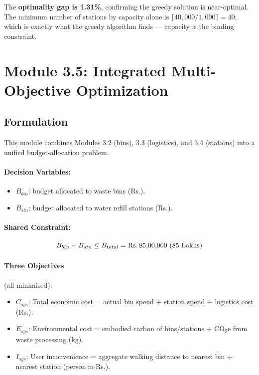 \documentclass[11pt,a4paper]{article}
\begin{document}
The \textbf{optimality gap is 1.31\%}, confirming the greedy solution is near-optimal. The minimum number of stations by capacity alone is $\lceil 40{,}000 / 1{,}000 \rceil = 40$, which is exactly what the greedy algorithm finds --- capacity is the binding constraint.

\section{Module 3.5: Integrated Multi-Objective Optimization}
\label{sec:mod35}

\subsection{Formulation}

This module combines Modules 3.2 (bins), 3.3 (logistics), and 3.4 (stations) into a unified budget-allocation problem.

\paragraph{Decision Variables:}
\begin{itemize}
    \item $B_{bin}$: budget allocated to waste bins (Rs.).
    \item $B_{stn}$: budget allocated to water refill stations (Rs.).
\end{itemize}

\paragraph{Shared Constraint:}
\begin{equation}
    B_{bin} + B_{stn} \le B_{total} = \text{Rs.\,85,00,000 (85 Lakhs)}
\end{equation}

\paragraph{Three Objectives} (all minimised):
\begin{itemize}
    \item $C_{sys}$: Total economic cost = actual bin spend + station spend + logistics cost (Rs.).
    \item $E_{sys}$: Environmental cost = embodied carbon of bins/stations + CO\textsubscript{2}e from waste processing (kg).
    \item $I_{sys}$: User inconvenience = aggregate walking distance to nearest bin + nearest station (person$\cdot$m$\cdot$Rs.).
\end{itemize}
\end{document}
